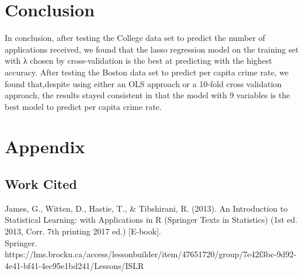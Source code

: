 \documentclass{article}
\begin{document}
\section{Conclusion}
In conclusion, after testing the College data set to predict the number of applications received, we found that the lasso regression model on the training set with λ chosen by cross-validation is the best at predicting with the highest accuracy. After testing the Boston data set to predict per capita crime rate, we found that,despite using either an OLS approach or a 10-fold cross validation approach, the results stayed consistent in that the model with 9 variables is the best model to predict per capita crime rate.

\newpage

\section{Appendix}

\subsection{Work Cited}
James, G., Witten, D., Hastie, T., & Tibshirani, R. (2013). An Introduction to Statistical Learning: with Applications in R (Springer Texts in Statistics) (1st ed. 2013, Corr. 7th printing 2017 ed.) [E-book].\\
Springer. https://lms.brocku.ca/access/lessonbuilder/item/47651720/group/7e42f3bc-9d92-4e41-bf41-4ec95e1bd241/Lessons/ISLR%
\end{document}
